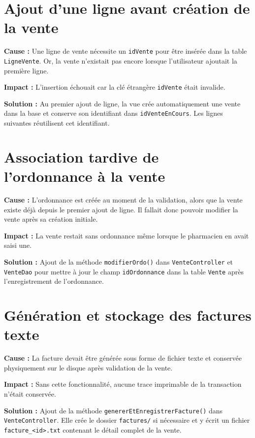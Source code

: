 \documentclass[12pt,a4paper]{report}
\begin{document}
\section{Ajout d'une ligne avant création de la vente}

\textbf{Cause :} Une ligne de vente nécessite un \texttt{idVente} pour être insérée dans la table \texttt{LigneVente}. Or, la vente n'existait pas encore lorsque l'utilisateur ajoutait la première ligne.

\textbf{Impact :} L'insertion échouait car la clé étrangère \texttt{idVente} était invalide.

\textbf{Solution :} Au premier ajout de ligne, la vue crée automatiquement une vente dans la base et conserve son identifiant dans \texttt{idVenteEnCours}. Les lignes suivantes réutilisent cet identifiant.

\section{Association tardive de l'ordonnance à la vente}

\textbf{Cause :} L'ordonnance est créée au moment de la validation, alors que la vente existe déjà depuis le premier ajout de ligne. Il fallait donc pouvoir modifier la vente après sa création initiale.

\textbf{Impact :} La vente restait sans ordonnance même lorsque le pharmacien en avait saisi une.

\textbf{Solution :} Ajout de la méthode \texttt{modifierOrdo()} dans \texttt{VenteController} et \texttt{VenteDao} pour mettre à jour le champ \texttt{idOrdonnance} dans la table \texttt{Vente} après l'enregistrement de l'ordonnance.

\section{Génération et stockage des factures texte}

\textbf{Cause :} La facture devait être générée sous forme de fichier texte et conservée physiquement sur le disque après validation de la vente.

\textbf{Impact :} Sans cette fonctionnalité, aucune trace imprimable de la transaction n'était conservée.

\textbf{Solution :} Ajout de la méthode \texttt{genererEtEnregistrerFacture()} dans \texttt{VenteController}. Elle crée le dossier \texttt{factures/} si nécessaire et y écrit un fichier \texttt{facture\_<id>.txt} contenant le détail complet de la vente.
\end{document}
